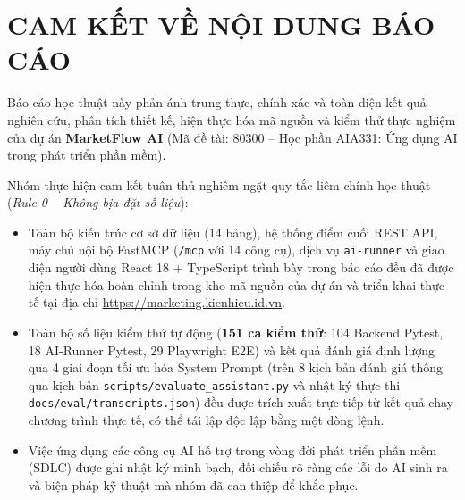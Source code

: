 \chapter*{CAM KẾT VỀ NỘI DUNG BÁO CÁO}

Báo cáo học thuật này phản ánh trung thực, chính xác và toàn diện kết quả nghiên cứu, phân tích thiết kế, hiện thực hóa mã nguồn và kiểm thử thực nghiệm của dự án \textbf{MarketFlow AI} (Mã đề tài: 80300 -- Học phần AIA331: Ứng dụng AI trong phát triển phần mềm).

Nhóm thực hiện cam kết tuân thủ nghiêm ngặt quy tắc liêm chính học thuật (\textit{Rule 0 -- Không bịa đặt số liệu}):
\begin{itemize}[noitemsep,topsep=4pt]
 \item Toàn bộ kiến trúc cơ sở dữ liệu (14 bảng), hệ thống điểm cuối REST API, máy chủ nội bộ FastMCP (\texttt{/mcp} với 14 công cụ), dịch vụ \texttt{ai-runner} và giao diện người dùng React 18 + TypeScript trình bày trong báo cáo đều đã được hiện thực hóa hoàn chỉnh trong kho mã nguồn của dự án và triển khai thực tế tại địa chỉ \url{https://marketing.kienhieu.id.vn}.
 \item Toàn bộ số liệu kiểm thử tự động (\textbf{151 ca kiểm thử}: 104 Backend Pytest, 18 AI-Runner Pytest, 29 Playwright E2E) và kết quả đánh giá định lượng qua 4 giai đoạn tối ưu hóa System Prompt (trên 8 kịch bản đánh giá thông qua kịch bản \texttt{scripts/evaluate\_assistant.py} và nhật ký thực thi \texttt{docs/eval/transcripts.json}) đều được trích xuất trực tiếp từ kết quả chạy chương trình thực tế, có thể tái lập độc lập bằng một dòng lệnh.
 \item Việc ứng dụng các công cụ AI hỗ trợ trong vòng đời phát triển phần mềm (SDLC) được ghi nhật ký minh bạch, đối chiếu rõ ràng các lỗi do AI sinh ra và biện pháp kỹ thuật mà nhóm đã can thiệp để khắc phục.
\end{itemize}
